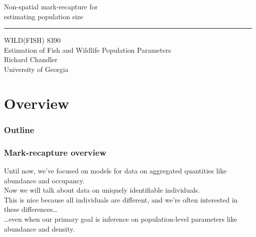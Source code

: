 \documentclass[color=usenames,dvipsnames]{beamer}\usepackage[]{graphicx}\usepackage[]{xcolor}
\begin{document}
\begin{frame}[plain]
  \LARGE
  \centering
  {
    \LARGE %
    Non-spatial mark-recapture for \\ estimating
    population size%
  }
  {\color{default} \rule{\textwidth}{0.1pt} }
  \vfill
  \large
  WILD(FISH) 8390 \\
  Estimation of Fish and Wildlife Population Parameters \\
  \vfill
  \large
  Richard Chandler \\
  University of Georgia \\
\end{frame}






\section{Overview}



\begin{frame}[plain]
  \frametitle{Outline}
  \Large
\end{frame}



\begin{frame}
  \frametitle{Mark-recapture overview}
  Until now, we've focused on models for data on aggregated quantities
  like abundance and occupancy. \\ 
  \pause
  \vfill
  Now we will talk about data on uniquely identifiable individuals. \\
  \pause
  \vfill
  This is nice because all individuals are different, and we're often
  interested in these differences\dots \\
  \pause
  \vfill
  \dots even when our primary goal is
  inference on population-level parameters like abundance
  and density. \\
\end{frame}
\end{document}
